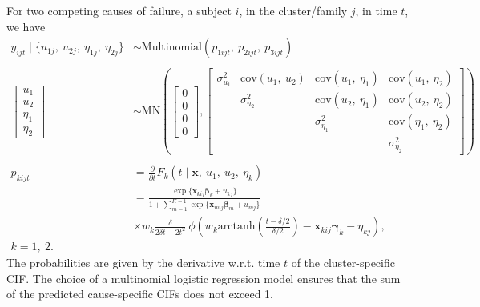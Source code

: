 For two competing causes of failure, a subject \(i\), in the
cluster/family \(j\), in time \(t\), we have
\begin{align}
 y_{i j t} \mid \{u_{1j},~u_{2j},~\eta_{1j},~\eta_{2j}\}
 &\sim\text{Multinomial}(p_{1ijt},~p_{2ijt},~p_{3ijt})\nonumber\\
 \nonumber\\
 \begin{bmatrix} u_{1}\\u_{2}\\\eta_{1}\\\eta_{2} \end{bmatrix}
 &\sim\text{MN}
  \left(
   \begin{bmatrix} 0\\0\\0\\0 \end{bmatrix},
   \begin{bmatrix}
    \sigma_{u_{1}}^{2}&
    \text{cov}(u_{1},~u_{2})&
    \text{cov}(u_{1},~\eta_{1})&\text{cov}(u_{1},~\eta_{2})\\
    &\sigma_{u_{2}}^{2}&
    \text{cov}(u_{2},~\eta_{1})&\text{cov}(u_{2},~\eta_{2})\\
    &&\sigma_{\eta_{1}}^{2}&\text{cov}(\eta_{1},~\eta_{2})\\
    &&&\sigma_{\eta_{2}}^{2}
   \end{bmatrix}
  \right)\nonumber\\
 \nonumber\\
 p_{kijt}
 &=\frac{\partial}{\partial t}
  F_{k} (t \mid \bm{x},~u_{1},~u_{2},~\eta_{k})\label{eq:model}\\
 &= \frac{\exp\{\bm{x}_{kij}\bm{\beta}_{k} + u_{kj}\}}{
    1 + \sum_{m=1}^{K-1}\exp\{\bm{x}_{mij}\bm{\beta}_{m} + u_{mj}\}}
  \nonumber\\
 &\times w_{k}\frac{\delta}{2\delta t - 2t^{2}}~
  \phi\left(
   w_{k}
   \text{arctanh}\left(\frac{t-\delta/2}{\delta/2}\right)
   - \bm{x}_{kij}\bm{\gamma}_{k} - \eta_{kj}
  \right),\nonumber\\k = 1,~2.\nonumber
\end{align}
The probabilities are given by the derivative w.r.t. time \(t\) of the
cluster-specific CIF. The choice of a multinomial logistic regression
model ensures that the sum of the predicted cause-specific CIFs does not
exceed 1.

